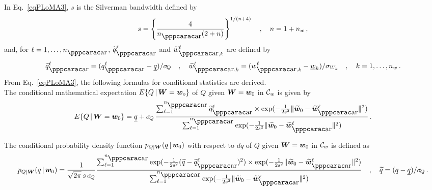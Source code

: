 %
In Eq.~\eqref{eqPLoMA3}, $s$ is the Silverman bandwidth defined by 
%
\begin{equation}\label{eqPLoMA4}
    s = \left\{\frac{4}{n_\ar(2+n)} \right\}^{1/(n + 4)}\quad ,\quad n = 1 + n_w \,,
\end{equation}
%
and, for $\ell=1,\ldots , n_\ar$, $\widetilde{q}_\ar^\ell$ and $\widetilde{w}^\ell_{\ar,k}$ are defined by
%
\begin{equation}\label{eqPLoMA5}
    \widetilde{q}_\ar^\ell = (q_\ar^\ell - \underline{q}) /{{\sigma_{\! Q}}}\quad , \quad
    \widetilde{w}^\ell_{\ar,k} = ({w}^\ell_{\ar,k} - \underline{w}_k) /{{\sigma_{W_k}}} \quad , \quad k=1,\ldots, n_w \,.
\end{equation}
%
From Eq.~\eqref{eqPLoMA3}, the following formulas for conditional statistics are derived.\\

 The conditional mathematical expectation $E\{Q \, \vert \, {\boldsymbol{W}} = {\boldsymbol{w}}_o\}$ of $Q$ given ${\boldsymbol{W}} = {\boldsymbol{w}}_0$ in ${\mathcal{C}}_w$ is given by
%
\begin{equation}
    E\{Q \, \vert \, \bfW = \bfw_0\} = \underline{q} + \sigma_{\! Q}\, \frac{\sum_{\ell=1}^{n_\ar}\widetilde{q}^{\ell}_{\ar} \times \exp({-\frac{1}{2s^2}\Vert \widetilde{\bfw}_{0}  -\widetilde{\bfw}^\ell_\ar \Vert^2})}{\sum_{\ell =  1}^{n_\ar}\exp({-\frac{1}{2s^2}\Vert \widetilde{\bfw}_{0} - \widetilde{\bfw}^\ell_\ar \Vert^2})} \,.
\end{equation}
%

 The conditional probability density function  $p_{Q \vert {\boldsymbol{W}}} (q\, \vert \, {\boldsymbol{w}}_0)$ with respect to $dq$ of $Q$ given ${\boldsymbol{W}} = {\boldsymbol{w}}_0$ in ${\mathcal{C}}_w$ is defined as
%
\begin{equation}
      p_{Q \vert \bfW} (q\, \vert \, \bfw_0)  = \frac{1}{\sqrt{2\pi}\,  s \,\sigma_{\! Q}}
      \frac{\sum_{\ell=1}^{n_\ar}
       \exp({-\frac{1}{2s^2}( \widetilde{q} - \widetilde{q}^\ell_\ar )^2})      
      \times \exp({-\frac{1}{2s^2}\Vert \widetilde{\bfw}_{0}  -\widetilde{\bfw}^\ell_\ar \Vert^2})}{\sum_{\ell =  1}^{n_\ar}\exp({-\frac{1}{2s^2}\Vert \widetilde{\bfw}_{0} - \widetilde{\bfw}^\ell_\ar \Vert^2})} \quad , \quad
      \widetilde{q} = (q - \underline{q}) /{{\sigma_{\! Q}}} \, .
\end{equation}
%


